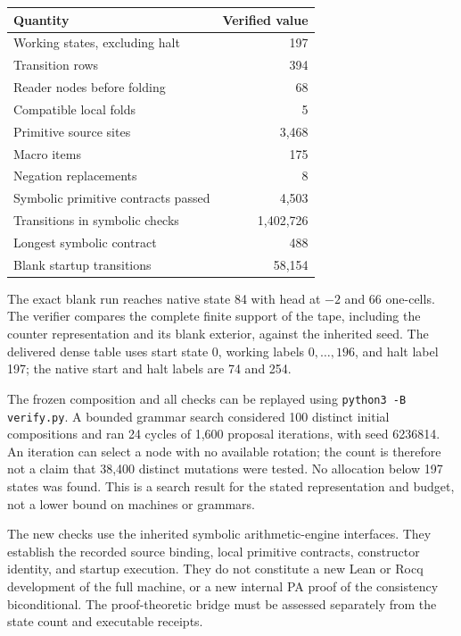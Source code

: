\begin{center}
\begin{tabular}{lr}
Quantity & Verified value\\\hline
Working states, excluding halt & 197\\
Transition rows & 394\\
Reader nodes before folding & 68\\
Compatible local folds & 5\\
Primitive source sites & 3,468\\
Macro items & 175\\
Negation replacements & 8\\
Symbolic primitive contracts passed & 4,503\\
Transitions in symbolic checks & 1,402,726\\
Longest symbolic contract & 488\\
Blank startup transitions & 58,154\\
\end{tabular}
\end{center}

The exact blank run reaches native state 84 with head at $-2$ and 66
one-cells.  The verifier compares the complete finite support of the
tape, including the counter representation and its blank exterior,
against the inherited seed.  The delivered dense table uses start state
0, working labels $0,\ldots,196$, and halt label 197; the native start
and halt labels are 74 and 254.

The frozen composition and all checks can be replayed using
\texttt{python3 -B verify.py}.  A bounded grammar search considered 100
distinct initial compositions and ran 24 cycles of 1,600 proposal
iterations, with seed 6236814.  An iteration can select a node with no
available rotation; the count is therefore not a claim that 38,400
distinct mutations were tested.  No allocation below 197 states was
found.  This is a search result for the stated representation and budget,
not a lower bound on machines or grammars.

The new checks use the inherited symbolic arithmetic-engine interfaces.
They establish the recorded source binding, local primitive contracts,
constructor identity, and startup execution.  They do not constitute a
new Lean or Rocq development of the full machine, or a new internal PA
proof of the consistency biconditional.  The proof-theoretic bridge must
be assessed separately from the state count and executable receipts.

